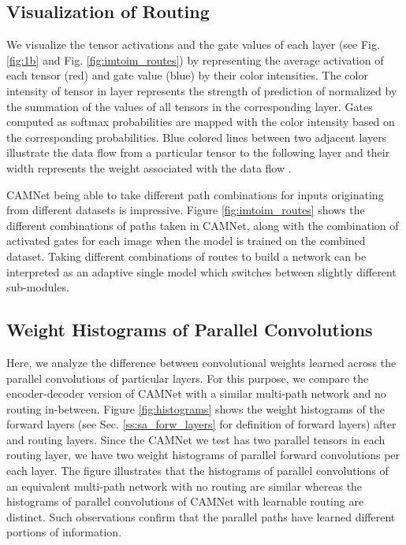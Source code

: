 \documentclass[10pt,twocolumn,letterpaper]{article}
\begin{document}
\subsection{Visualization of Routing}
\label{ss:visualization}
\vspace{-0.05in}
We visualize the tensor activations and the gate values of each layer (see Fig. \ref{fig:1b} and Fig. \ref{fig:imtoim_routes}) by representing the average activation of each tensor (red) and gate value (blue) by their color intensities. 
The color intensity of tensor  in layer  represents the strength of prediction of   normalized by the summation of the values of all tensors in the corresponding layer. Gates computed as softmax probabilities are mapped with the color intensity based on the corresponding probabilities. Blue colored lines between two adjacent layers illustrate the data flow from a particular tensor to the following layer and their width represents the weight associated with the data flow .

CAMNet being able to take different path combinations for inputs originating from different datasets is impressive. Figure \ref{fig:imtoim_routes} shows the different combinations of paths taken in CAMNet, along with the combination of activated gates for each image when the model is trained on the combined dataset. Taking different combinations of routes to build a network can be interpreted as an adaptive single model which switches between slightly different sub-modules. 



\subsection{Weight Histograms of Parallel Convolutions}
\label{ss:weights}
\vspace{-0.05in}
Here, we analyze the difference between convolutional weights learned across the parallel convolutions of particular layers. For this purpose, we compare the encoder-decoder version of CAMNet with a similar multi-path network and no routing in-between. Figure \ref{fig:histograms} shows the weight histograms of the forward layers (see Sec. \ref{ss:sa_forw_layers} for definition of forward layers) after  and  routing layers. Since the CAMNet we test has two parallel tensors in each routing layer, we have two weight histograms of parallel forward convolutions per each layer. The figure illustrates that the histograms of parallel convolutions of an equivalent multi-path network with no routing are similar whereas the histograms of parallel convolutions of CAMNet with learnable routing are distinct. Such observations confirm that the parallel paths have learned different portions of information. 
\end{document}
